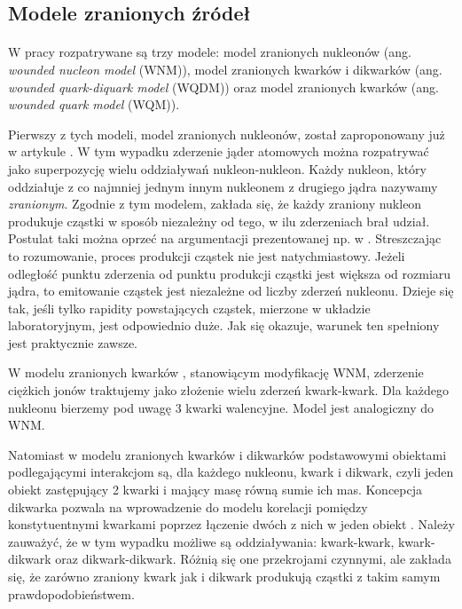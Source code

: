 \documentclass[a4paper,12pt]{article}
\begin{document}
\subsection{Modele zranionych źródeł}
\paragraph{}
W pracy rozpatrywane są trzy modele: model zranionych nukleonów (ang. \textit{wounded nucleon model} (WNM)), model zranionych kwarków i dikwarków (ang. \textit{wounded quark-diquark model} (WQDM)) oraz model zranionych kwarków (ang. \textit{wounded quark model} (WQM)). 

Pierwszy z tych modeli, model zranionych nukleonów, został zaproponowany już w artykule \cite{Bialas:1976ed}. W tym wypadku zderzenie jąder atomowych można rozpatrywać jako superpozycję wielu oddziaływań nukleon-nukleon. Każdy nukleon, który oddziałuje z co najmniej jednym innym nukleonem z drugiego jądra nazywamy \textit{zranionym}. Zgodnie z tym modelem, zakłada się, że każdy zraniony nukleon produkuje cząstki w sposób niezależny od tego, w ilu zderzeniach brał udział. Postulat taki można oprzeć na argumentacji prezentowanej np. w \cite{Bialas:2007eg}. Streszczając to rozumowanie, proces produkcji cząstek nie jest natychmiastowy. Jeżeli odległość punktu zderzenia od punktu produkcji cząstki jest większa od rozmiaru jądra, to emitowanie cząstek jest niezależne od liczby zderzeń nukleonu. Dzieje się tak, jeśli tylko rapidity powstających cząstek, mierzone w układzie laboratoryjnym, jest odpowiednio duże. Jak się okazuje, warunek ten spełniony jest praktycznie zawsze.

W modelu zranionych kwarków \cite{Bialas:1977en}, stanowiącym modyfikację WNM, zderzenie ciężkich jonów traktujemy jako złożenie wielu zderzeń kwark-kwark. Dla każdego nukleonu bierzemy pod uwagę 3 kwarki walencyjne. Model jest analogiczny do WNM. 

Natomiast w modelu zranionych kwarków i dikwarków \cite{Bialas:2007eg} podstawowymi obiektami podlegającymi interakcjom są, dla każdego nukleonu, kwark i dikwark, czyli jeden obiekt zastępujący 2 kwarki i mający masę równą sumie ich mas. Koncepcja dikwarka pozwala na wprowadzenie do modelu korelacji pomiędzy konstytuentnymi kwarkami poprzez łączenie dwóch z nich w jeden obiekt \cite{Bialas:2006qf}. Należy zauważyć, że w tym wypadku możliwe są oddziaływania: kwark-kwark, kwark-dikwark oraz dikwark-dikwark. Różnią się one przekrojami czynnymi, ale zakłada się, że zarówno zraniony kwark jak i dikwark produkują cząstki z takim samym prawdopodobieństwem.
\end{document}
